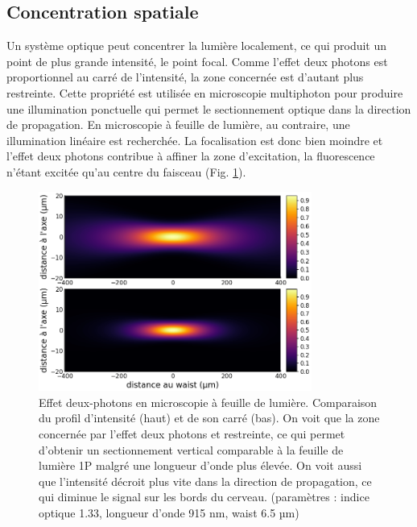 \subsection{Concentration spatiale}
 
Un système optique peut concentrer la lumière localement, ce qui produit un point de plus grande intensité, le point focal. Comme l'effet deux photons est proportionnel au carré de l'intensité, la zone concernée est d'autant plus restreinte. Cette propriété est utilisée en microscopie multiphoton pour produire une illumination ponctuelle qui permet le sectionnement optique dans la direction de propagation. En microscopie à feuille de lumière, au contraire, une illumination linéaire est recherchée. La focalisation est donc bien moindre et l'effet deux photons contribue à affiner la zone d'excitation, la fluorescence n'étant excitée qu'au centre du faisceau (Fig. \ref{FIG2P-intensity-profile}).


\begin{figure}[p]
    \centering
    \includegraphics[width=0.8\textwidth]{./files/profile-intensity.png}
    \caption{Effet deux-photons en microscopie à feuille de lumière. Comparaison du profil d'intensité (haut) et de son carré (bas). On voit que la zone concernée par l'effet deux photons et restreinte, ce qui permet d'obtenir un sectionnement vertical comparable à la feuille de lumière 1P malgré une longueur d'onde plus élevée. On voit aussi que l'intensité décroit plus vite dans la direction de propagation, ce qui diminue le signal sur les bords du cerveau. (paramètres : indice optique 1.33, longueur d'onde 915 nm, waist 6.5 µm)}
    \label{FIG2P-intensity-profile}
    \end{figure}

